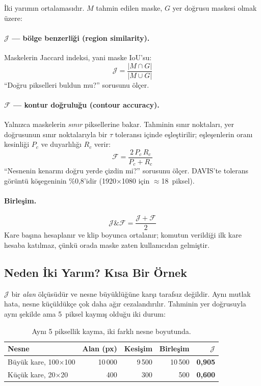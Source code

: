 İki yarımın ortalamasıdır. $M$ tahmin edilen maske, $G$ yer doğrusu
maskesi olmak üzere:

\paragraph{$\mathcal{J}$ --- bölge benzerliği (region similarity).}
Maskelerin Jaccard indeksi, yani maske IoU'su:
\begin{equation}
  \mathcal{J} = \frac{|M \cap G|}{|M \cup G|}
  \label{eq:jaccard}
\end{equation}
``Doğru pikselleri buldun mu?'' sorusunu ölçer.

\paragraph{$\mathcal{F}$ --- kontur doğruluğu (contour accuracy).}
Yalnızca maskelerin \emph{sınır} piksellerine bakar. Tahminin sınır
noktaları, yer doğrusunun sınır noktalarıyla bir $\tau$ toleransı
içinde eşleştirilir; eşleşenlerin oranı kesinliği $P_c$ ve
duyarlılığı $R_c$ verir:
\begin{equation}
  \mathcal{F} = \frac{2\,P_c\,R_c}{P_c + R_c}
  \label{eq:fmeasure}
\end{equation}
``Nesnenin kenarını doğru yerde çizdin mi?'' sorusunu ölçer. DAVIS'te
tolerans görüntü köşegeninin \%0,8'idir (1920×1080 için
$\approx$18~piksel).

\paragraph{Birleşim.}
\begin{equation}
  \mathcal{J\&F} = \frac{\mathcal{J} + \mathcal{F}}{2}
  \label{eq:jf}
\end{equation}
Kare başına hesaplanır ve klip boyunca ortalanır; komutun verildiği ilk
kare hesaba katılmaz, çünkü orada maske zaten kullanıcıdan gelmiştir.

\subsection*{Neden İki Yarım? Kısa Bir Örnek}

$\mathcal{J}$ bir \emph{alan} ölçüsüdür ve nesne büyüklüğüne karşı
tarafsız değildir. Aynı mutlak hata, nesne küçüldükçe çok daha ağır
cezalandırılır. Tahminin yer doğrusuyla aynı şekilde ama 5~piksel kaymış
olduğu iki durum:

\begin{table}[H]
  \centering
  \caption{Aynı 5 piksellik kayma, iki farklı nesne boyutunda.}
  \label{tab:jf-ornek}
  \small
  \begin{tabular}{lrrrr}
    \toprule
    Nesne & Alan (px) & Kesişim & Birleşim & $\mathcal{J}$ \\
    \midrule
    Büyük kare, 100×100 & 10\,000 & 9\,500 & 10\,500 & \textbf{0,905} \\
    Küçük kare, 20×20   &    400  &   300  &    500  & \textbf{0,600} \\
    \bottomrule
  \end{tabular}
\end{table}

